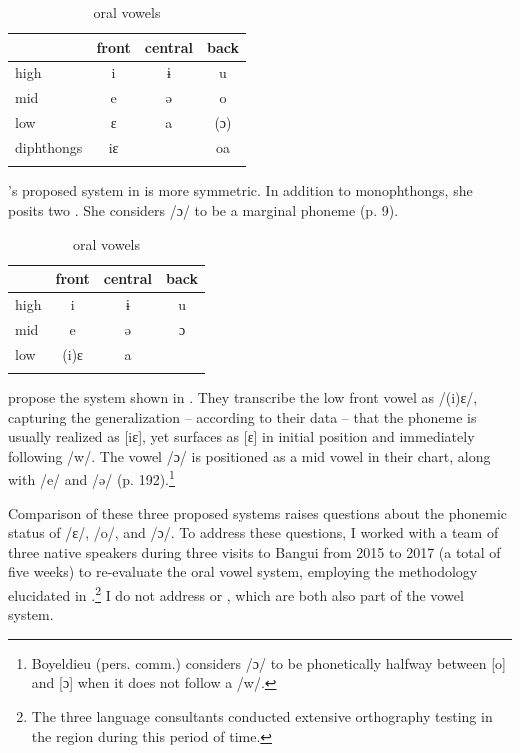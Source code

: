 \documentclass[output=paper,colorlinks,citecolor=brown]{langscibook}
\begin{document}
\begin{table}
\caption{ oral vowels \citep[43]{Théret-Kieschke1998}}
\label{tab:olson:2}
    \begin{tabular}{lccc}
    \lsptoprule
                    & front & central & back\\
    \midrule
        high        & i     & ɨ       & u\\
        mid         & e     & ə       & o\\
        low         & ɛ     & a       & (ɔ)\\
        diphthongs  & iɛ    &         & oa\\
    \lspbottomrule
    \end{tabular}
\end{table}

\citeauthor{Théret-Kieschke1998}’s proposed system in  is more  symmetric. In addition to monophthongs, she posits two . She considers /ɔ/ to be a marginal phoneme  (p. 9).

\begin{table}
\caption{ oral vowels \citep[191]{BoyeldieuCloarec-Heiss2001}}
\label{tab:olson:3}
    \begin{tabular}{lccc}
    \lsptoprule
                & front & central & back\\
    \midrule
    high        & i     & ɨ       & u\\
    mid         & e     & ə       & ɔ\\
    low         & (i)ɛ  & a       &\\
    \lspbottomrule
    \end{tabular}
\end{table}

\citeauthor{BoyeldieuCloarec-Heiss2001} propose the system shown in . They transcribe the low front vowel as /(i)ɛ/, capturing the generalization -- according to their data -- that the phoneme is usually realized as [iɛ], yet surfaces as [ɛ] in initial position and immediately following /w/. The vowel /ɔ/ is positioned as a mid vowel in their chart, along with /e/ and /ə/ (p. 192).\footnote{Boyeldieu (pers. comm.) considers /ɔ/ to be phonetically halfway between [o] and [ɔ] when it does not follow a /w/.}

Comparison of these three proposed systems  raises questions about the phonemic status of /ɛ/, /o/, and /ɔ/. To address these questions, I worked with a team of three native  speakers during three visits to Bangui from 2015 to 2017 (a total of five weeks) to re-evaluate the oral vowel system, employing the  methodology elucidated in \citet{Kutsch-Lojenga1996}.\footnote{The three language consultants conducted extensive orthography testing in the  region during this period of time.}  I do not address  or , which are both also part of the   vowel system.
\end{document}

